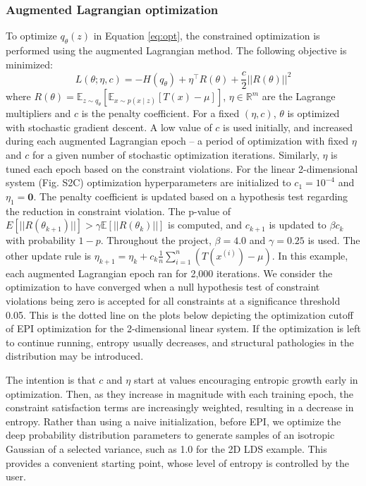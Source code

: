 \documentclass[11pt]{article}
\begin{document}
\subsubsection{Augmented Lagrangian optimization}\label{methods_AL_opt}
To optimize $q_\theta(z)$ in Equation \ref{eq:opt}, the constrained optimization is performed using the augmented Lagrangian method.  The following objective is minimized:
\begin{equation}
L(\theta; \eta, c) = -H(q_\theta) + \eta^\top R(\theta) + \frac{c}{2}||R(\theta)||^2
\end{equation}
where $R(\theta) = \mathbb{E}_{z \sim q_\theta}\left[ \mathbb{E}_{x\sim p(x \mid z)}\left[T(x) - \mu \right] \right]$, $\eta \in \mathbb{R}^m$ are the Lagrange multipliers and $c$ is the penalty coefficient.  For a fixed $(\eta, c)$, $\theta$ is optimized with stochastic gradient descent.  A low value of $c$ is used initially, and increased during each augmented Lagrangian epoch -- a period of optimization with fixed $\eta$ and $c$ for a given number of stochastic optimization iterations. Similarly, $\eta$ is tuned each epoch based on the constraint violations.  For the linear 2-dimensional system (Fig. S2C) optimization hyperparameters are initialized to $c_1 = 10^{-4}$ and $\eta_1 = \textbf{0}$.  The penalty coefficient is updated based on a hypothesis test regarding the reduction in constraint violation.  The p-value of $E[||R(\theta_{k+1})||] > \gamma \mathbb{E} \left[||R(\theta_{k})|| \right]$ is computed, and $c_{k+1}$ is updated  to $\beta c_k$ with probability $1-p$.  Throughout the project, $\beta = 4.0$ and $\gamma = 0.25$ is used.  The other update rule is $\eta_{k+1} = \eta_k + c_k \frac{1}{n} \sum_{i=1}^n (T(x^{(i)}) - \mu)$.  In this example, each augmented Lagrangian epoch ran for 2,000 iterations.  We consider the optimization to have converged when a null hypothesis test of constraint violations being zero is accepted for all constraints at a significance threshold 0.05.  This is the dotted line on the plots below depicting the optimization cutoff of EPI optimization for the 2-dimensional linear system.  If the optimization is left to continue running, entropy usually decreases, and structural pathologies in the distribution may be introduced.

The intention is that $c$ and $\eta$ start at values encouraging entropic growth early in optimization.  Then, as they increase in magnitude with each training epoch, the constraint satisfaction terms are increasingly weighted, resulting in a decrease in entropy.  Rather than using a naive initialization, before EPI, we optimize the deep probability distribution parameters to generate samples of an isotropic Gaussian of a selected variance, such as 1.0 for the 2D LDS example.  This provides a convenient starting point, whose level of entropy is controlled by the user.
\end{document}
